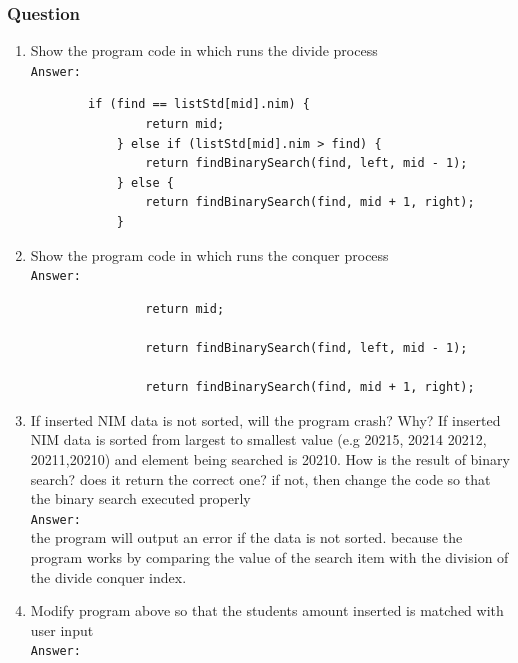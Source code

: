 \documentclass[12pt,titlepage]{article}
\begin{document}
\subsubsection{Question}

\begin{enumerate}
    \item Show the program code in which runs the divide process
    \mbox{}\\
    \texttt{Answer: }
    \begin{verbatim}
        if (find == listStd[mid].nim) {
                return mid;
            } else if (listStd[mid].nim > find) {
                return findBinarySearch(find, left, mid - 1);
            } else {
                return findBinarySearch(find, mid + 1, right);
            }
    \end{verbatim}
    \item Show the program code in which runs the conquer process
    \mbox{}\\
    \texttt{Answer: }
    \begin{verbatim}
                return mid;

                return findBinarySearch(find, left, mid - 1);

                return findBinarySearch(find, mid + 1, right);
    \end{verbatim}
    \item If inserted NIM data is not sorted, will the program crash? Why? If inserted NIM data is sorted from largest to smallest value (e.g 20215, 20214 20212, 20211,20210) and element being searched is 20210. How is the result of binary search? does it return the correct one? if not, then change the code so that the binary search executed properly
    \mbox{}\\
    \texttt{Answer: }
    \mbox{}\\
    the program will output an error if the data is not sorted. because the program works by comparing the value of the search item with the division of the divide conquer index.
    \item Modify program above so that the students amount inserted is matched with user input
    \mbox{}\\
    \texttt{Answer: }
    \mbox{}\\
\end{enumerate}
\end{document}
